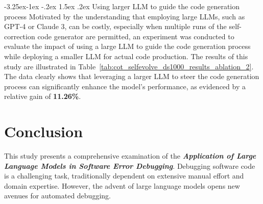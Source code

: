 \documentclass[a4paper,oneside]{book}
\makeatletter
\newcounter {subsubsubsection}[subsubsection]
\newcommand\subsubsubsection{\@startsection{subsubsubsection}{4}{\z@}%
                                    {-3.25ex\@plus -1ex \@minus -.2ex}%
                                    {1.5ex \@plus .2ex}%
                                    {\normalfont\normalsize\bfseries}}
\makeatother
\begin{document}
\subsubsubsection{Using larger LLM to guide the code generation process}
Motivated by the understanding that employing large LLMs, such as GPT-4 or Claude 3, can be costly, especially when multiple runs of the self-correction code generator are permitted, an experiment was conducted to evaluate the impact of using a large LLM to guide the code generation process while deploying a smaller LLM for actual code production. The results of this study are illustrated in Table~\ref{tab:cot_selfevolve_ds1000_results_ablation_2}. The data clearly shows that leveraging a larger LLM to steer the code generation process can significantly enhance the model's performance, as evidenced by a relative gain of \textbf{11.26\%}.

\begin{table}[H]
    \caption{$\text{Pass@5}$ results on the DS-1000 dataset with different LLM stacks. (\%)}\label{tab:cot_selfevolve_ds1000_results_ablation_2}
    \centering
\end{table}

\chapter{Conclusion}
This study presents a comprehensive examination of the \textbf{\textit{Application of Large Language Models in Software Error Debugging}}. Debugging software code is a challenging task, traditionally dependent on extensive manual effort and domain expertise. However, the advent of large language models opens new avenues for automated debugging.
\end{document}
